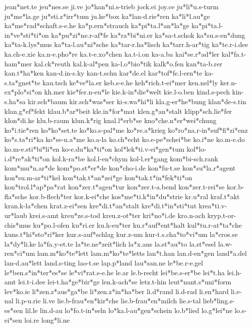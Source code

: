 jean*net.te
jeu*nes.se
ji.ve
jo*han*ni.s-trieb
jock.ei
joy.ce
ju*li*u.s-turm
ju*me*la.ge
ju*sti.z*irr*tum
ju.ke*box
ka*lan-d.rie*ren
ka*li*l.au*ge
ka*me*rad*schaft.s-e.he
ka*p.ern*strauch
ka*pi*ta.l*an*la*ge
ka*pi*ta.l-in*ve*sti*ti*on
ka*pu*zi*ne.r-af*fe
ka*ra*bi*ni.er
ka*sa-t.schok
ka*su.s-en*dung
ka*ta-k.lys*mus
ka*ta-l.au*ni*sche
ka*tar-r.ha*lisch
ka*tarr.h-ar*tig
ka*te.r-i.dee
ka.ch-e.xie
ka.n-e.pho*re
ka.t-e.xo*chen
ka.t-i.on
ka-a.ba
kai*se.r*ad*ler
kal*fa.t-ham*mer
kal.ck*reuth
kal.k-al*pen
ka-l.o*bio*tik
kalk*o.fen
kan*ta-b.rer
kan.t*ha*ken
kan-d.in-s.ky
kan-t.schu
kar*de.el
kar*tof*fe.l-ern*te
ka-s.ta*gnet*te
kau.tsch
ke*ve*la.er
keb.s-e.he
keh*rich.t-ei*mer
ken.nel*ly
ker.n-ex*plo*si*on
kh.mer
kie*fer.n-eu*le
kie.k-in*die*welt
kie.l-o.ben
kind.s-pech
kin-s.ha*sa
kir.sch*baum
kir.sch*was*ser
ki-s.wa*hi*li
kla.g-er*he*bung
klan*de-s.tin
klan.g*ef*fekt
klau.b*ar*beit
kle.in*for*mat
klen.g*an*stalt
klipp*sch.lie*fer
klon*di.ke
klu.b-raum
klun.k*rig
knal.l*erb*se
kno*che.n*er*wei*chung
ko*i.tie*ren
ko*ko*set.te
ko*ko.s-pal*me
ko*re.a*krieg
ko*ro*na.r-in*suf*fi*zi*enz
ko*s.ta*ri*ka
ko*se-n.a*me
ko.a-la
ko.ch*echt
ko.e-pe*schei*be
ko.i*ne
ko.m-e.do
ko.m-e.sti*bi*li*en
ko-e.du*ka*ti*on
kol*lek*ti.v-ei*gen*tum
kol*lo-i.d*re*ak*ti*on
kol.k-ra*be
kol.l-en*chym
kol-l.er*gang
kom*bi-sch.rank
kom*mu*n.ar*de
kom*po.st*er*de
kon*cho-i.de
kon*fu-t.se
kon*su*la.r*agent
kon*su.m-ar*ti*kel
kon*tak.t*an*zei*ge
kon*tak.t*in*fek*ti*on
kon*trol.l*ap*pa*rat
kon*zer.t*agen*tur
kon*zer.t-a.bend
kon*zer.t-rei*se
kor.b-fla*sche
kor.b-flech*ter
kor.k-ei*che
kos*me*ti.k*in*du*strie
kr.u*ral
kraf.t*akt
kran.k-la*chen
krat.z-ei*sen
kre*di.t*an*stalt
kre*di.t*in*sti*tut
krea*ti.v-ur*laub
krei.s-amt
kreu*ze.s-tod
kreu.z-ot*ter
kri*no*i.de
kro.n-ach
kryp.t-or-chis*mus
ku*po.l-ofen
ku*ri.er
ku.h-eu*ter
ku.r*auf*ent*halt
kul*tu.r-at*ta*che
kuns.t*hi*sto*ri*ker
kur.s-auf*schlag
kur.z-um
kur-t.s.cha*to*vi*um
la*cros.se
la*dy*li.ke
la*fa.y-et.te
la*te.ne*zeit*lich
la*x.ans
la.st*au*to
la.st*esel
la.w-ren*ci*um
lam.m*ko*te*lett
lam.m*ko*te*letts
lan*t.han
lan.d-en*gen
land*a.del
lan-d.au*lett
land.s-ting
lao-t.se
lap.p*land
lau*san.ne
le*be.r-e.gel
le*ben.s*in*ter*es*se
le*vi*rat.s-e.he
le.ar
le.b-recht
lei*be.s-er*be
lei*t.ha
lei.h-amt
lei.t-i.dee
lei-t.ha*ge*bir*ge
len.k-ach*se
letz.t-hin
leut*nant.s*uni*form
lev*ko.ie
li*zen.z*aus*ga*be
li*zen.z*in*ha*ber
li.d*rand
li.d-rad
li.en*hard
li.e-nal
li.p-u.rie
li.ve
lie.b-frau*en*kir*che
lie.b-frau*en*milch
lie.s-tal
lieb*ling.s-es*sen
lil.le
lin.d-au
lo*fo.t-in*seln
lo*ka.l-au*gen*schein
lo.b*lied
lo.g*lei*ne
lo.s-ei*sen
loi.re
long*li.ne
